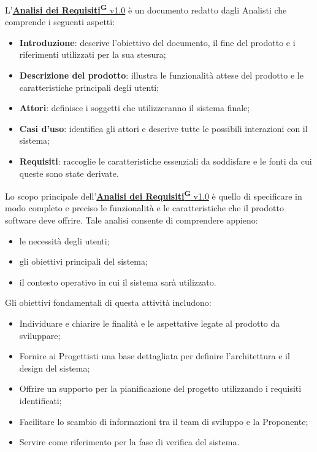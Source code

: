 L'\href{https://code7crusaders.github.io/docs/PB/documentazione_interna/glossario.html#analisi-dei-requisiti}{\textbf{Analisi dei Requisiti\textsuperscript{G}} v1.0} è un documento redatto dagli Analisti che comprende i seguenti aspetti:
\begin{itemize}
    \item \textbf{Introduzione}: descrive l’obiettivo del documento, il fine del prodotto e i riferimenti utilizzati per la sua stesura;
    \item \textbf{Descrizione del prodotto}: illustra le funzionalità attese del prodotto e le caratteristiche principali degli utenti;
    \item \textbf{Attori}: definisce i soggetti che utilizzeranno il sistema finale;
    \item \textbf{Casi d’uso}: identifica gli attori e descrive tutte le possibili interazioni con il sistema;
    \item \textbf{Requisiti}: raccoglie le caratteristiche essenziali da soddisfare e le fonti da cui queste sono state derivate.
\end{itemize}

Lo scopo principale dell'\href{https://code7crusaders.github.io/docs/PB/documentazione_interna/glossario.html#analisi-dei-requisiti}{\textbf{Analisi dei Requisiti\textsuperscript{G}} v1.0} è quello di specificare in modo completo e preciso le funzionalità e le caratteristiche che il prodotto software deve offrire. Tale analisi consente di comprendere appieno:
\begin{itemize}
    \item le necessità degli utenti;
    \item gli obiettivi principali del sistema;
    \item il contesto operativo in cui il sistema sarà utilizzato.
\end{itemize}

Gli obiettivi fondamentali di questa attività includono:
\begin{itemize}
    \item Individuare e chiarire le finalità e le aspettative legate al prodotto da sviluppare;
    \item Fornire ai Progettisti una base dettagliata per definire l’architettura e il design del sistema;
    \item Offrire un supporto per la pianificazione del progetto utilizzando i requisiti identificati;
    \item Facilitare lo scambio di informazioni tra il team di sviluppo e la Proponente;
    \item Servire come riferimento per la fase di verifica del sistema.
\end{itemize}



